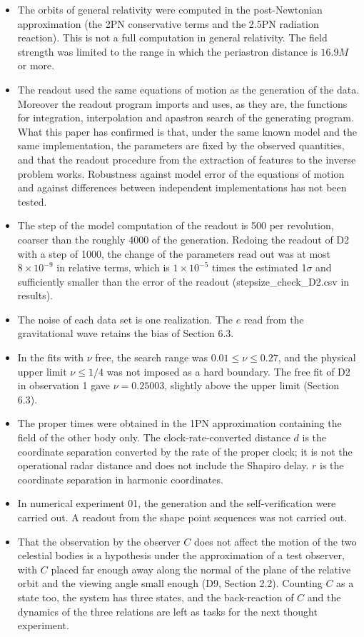 \documentclass[
  a4paper,
]{article}
\providecommand{\tightlist}{%
  \setlength{\itemsep}{0pt}\setlength{\parskip}{0pt}}
\begin{document}
\begin{itemize}
\tightlist
\item
  The orbits of general relativity were computed in the post-Newtonian
  approximation (the 2PN conservative terms and the 2.5PN radiation
  reaction). This is not a full computation in general relativity. The
  field strength was limited to the range in which the periastron
  distance is \(16.9M\) or more.
\item
  The readout used the same equations of motion as the generation of the
  data. Moreover the readout program imports and uses, as they are, the
  functions for integration, interpolation and apastron search of the
  generating program. What this paper has confirmed is that, under the
  same known model and the same implementation, the parameters are fixed
  by the observed quantities, and that the readout procedure from the
  extraction of features to the inverse problem works. Robustness
  against model error of the equations of motion and against differences
  between independent implementations has not been tested.
\item
  The step of the model computation of the readout is 500 per
  revolution, coarser than the roughly 4000 of the generation. Redoing
  the readout of D2 with a step of 1000, the change of the parameters
  read out was at most \(8\times10^{-9}\) in relative terms, which is
  \(1\times10^{-5}\) times the estimated 1\(\sigma\) and sufficiently
  smaller than the error of the readout (stepsize\_check\_D2.csv in
  results).
\item
  The noise of each data set is one realization. The \(e\) read from the
  gravitational wave retains the bias of Section 6.3.
\item
  In the fits with \(\nu\) free, the search range was
  \(0.01\le\nu\le0.27\), and the physical upper limit \(\nu\le1/4\) was
  not imposed as a hard boundary. The free fit of D2 in observation 1
  gave \(\nu=0.25003\), slightly above the upper limit (Section 6.3).
\item
  The proper times were obtained in the 1PN approximation containing the
  field of the other body only. The clock-rate-converted distance \(d\)
  is the coordinate separation converted by the rate of the proper
  clock; it is not the operational radar distance and does not include
  the Shapiro delay. \(r\) is the coordinate separation in harmonic
  coordinates.
\item
  In numerical experiment 01, the generation and the self-verification
  were carried out. A readout from the shape point sequences was not
  carried out.
\item
  That the observation by the observer \(C\) does not affect the motion
  of the two celestial bodies is a hypothesis under the approximation of
  a test observer, with \(C\) placed far enough away along the normal of
  the plane of the relative orbit and the viewing angle small enough
  (D9, Section 2.2). Counting \(C\) as a state too, the system has three
  states, and the back-reaction of \(C\) and the dynamics of the three
  relations are left as tasks for the next thought experiment.
\end{itemize}
\end{document}
